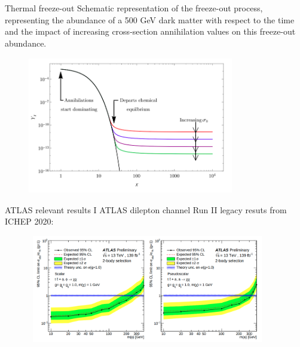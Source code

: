 \documentclass[8pt]{beamer}
\begin{document}
\begin{frame}{Thermal freeze-out}
\justifying
\vspace{5pt}
Schematic representation of the freeze-out process, representing the abundance of a
500 GeV dark matter with respect to the time and the impact of increasing cross-section annihilation
values on this freeze-out abundance. \vfill

\begin{figure}[htbp]
\begin{center}
\includegraphics[width=9cm, height=6cm]{figs/FreezeOut.png}
\end{center}
\end{figure} \vfill
\end{frame}

\begin{frame}{ATLAS relevant results I}
\justifying
ATLAS dilepton channel Run II legacy resuts from ICHEP 2020: \vfill

 \begin{figure}[htbp]
\centering
\includegraphics[width=10.5cm, height=4.7cm]{figs/ATLASICHEP.png}
\end{figure} \vfill
\end{frame}
\end{document}
